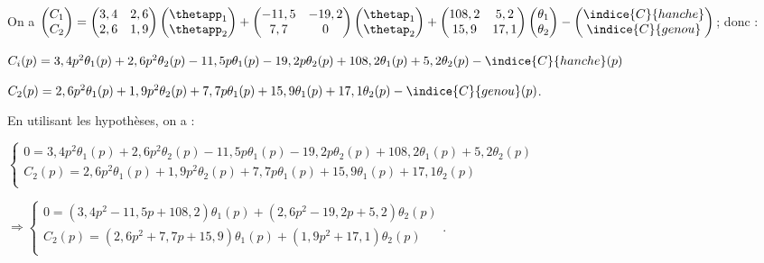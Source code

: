 \ifprof\begin{corrige}
On a $
\begin{pmatrix}
C_1 \\
C_2
\end{pmatrix}
=\begin{pmatrix}
3,4 & 2,6 \\
2,6 & 1,9
\end{pmatrix} \begin{pmatrix}
\thetapp_1 \\
\thetapp_2
\end{pmatrix}
+
\begin{pmatrix}
-11,5 & -19,2 \\
7,7 & 0
\end{pmatrix} \begin{pmatrix}
\thetap_1 \\
\thetap_2
\end{pmatrix}
+
\begin{pmatrix}
108,2 & 5,2 \\
15,9 & 17,1
\end{pmatrix} 
\begin{pmatrix}
\theta_1 \\
\theta_2
\end{pmatrix}-
\begin{pmatrix}
\indice{C}{hanche} \\
\indice{C}{genou}
\end{pmatrix}
$; donc : 

$C_i(p) = 3,4 p^2 \theta_1(p) + 2,6p^2\theta_2(p) - 11,5 p\theta_1(p) - 19,2p\theta_2(p) + 108,2\theta_1(p) + 5,2\theta_2(p) - \indice{C}{hanche}(p)$

$C_2(p) = 2,6 p^2 \theta_1(p) + 1,9 p^2\theta_2(p) + 7,7 p\theta_1(p) + 15,9\theta_1(p) + 17,1\theta_2(p) - \indice{C}{genou}(p)$.

En utilisant les hypothèses, on a :

$\left\{
\begin{array}{l} 
0= 3,4 p^2 \theta_1(p) + 2,6p^2\theta_2(p) - 11,5 p\theta_1(p) - 19,2p\theta_2(p) + 108,2\theta_1(p) + 5,2\theta_2(p) \\
C_2(p) = 2,6 p^2 \theta_1(p) + 1,9 p^2\theta_2(p) + 7,7 p\theta_1(p) + 15,9\theta_1(p) + 17,1\theta_2(p) \\
\end{array}
\right.$

$\Rightarrow \left\{
\begin{array}{l} 
0= \left(3,4 p^2 - 11,5 p + 108,2\right) \theta_1(p) + \left(2,6p^2 - 19,2p + 5,2\right)\theta_2(p) \\
C_2(p) = \left( 2,6 p^2 + 7,7 p + 15,9\right)\theta_1(p) + \left( 1,9 p^2+ 17,1\right)\theta_2(p) \\
\end{array}
\right.$.




\end{corrige}
